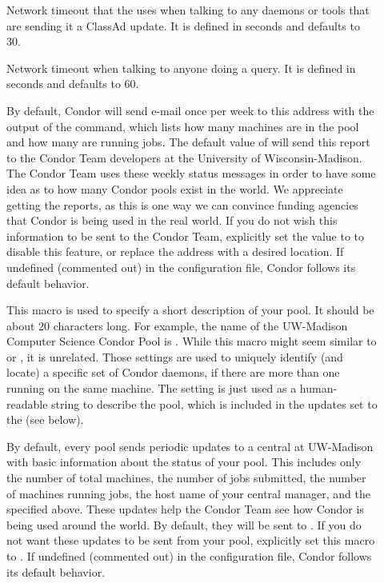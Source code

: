 \begin{description}
\item[] \label{param:ClientTimeout} Network
  timeout that the  uses when talking to any daemons
  or tools that are sending it a ClassAd update.
  It is defined in seconds and defaults to 30.
  
\item[] \label{param:QueryTimeout} Network
  timeout when talking to anyone doing a query. It is defined in seconds
  and defaults to 60.
  
\item[] \label{param:CondorDevelopers}
  By default,
  Condor will send e-mail once per week to this address with the output
  of the  command, which lists how many machines
  are in the pool and how many are running jobs.  The default
  value of  will send this report to
  the Condor Team developers at the University of Wisconsin-Madison.
  The Condor Team uses
  these weekly status messages in order to have some idea as to how
  many Condor pools exist in the world.  We appreciate
  getting the reports, as this is one way we can convince funding
  agencies that Condor is being used in the real world.  
  If you do not wish this information to be sent to the Condor Team,
  explicitly set the value to  to disable this feature,
  or replace the
  address with a desired location.  
  If undefined (commented out) in the configuration file, Condor follows
  its default behavior.

\item[] \label{param:CollectorName}
  This macro is used to specify a short description of your pool.
  It should be about 20 characters long.  For example, the name of the
  UW-Madison Computer Science Condor Pool is .  
  While this macro might seem similar to  or
  , it is unrelated.
  Those settings are used to uniquely identify (and locate) a specific
  set of Condor daemons, if there are more than one running on the same
  machine.
  The  setting is just used as a
  human-readable string to describe the pool, which is included in the
  updates set to the  (see
  below). 

\item[]
  \label{param:CondorDevelopersCollector} By default, every pool sends
  periodic updates to a central  at UW-Madison with
  basic information about the status of your pool.  This includes only
  the number of total machines, the number of jobs submitted, the
  number of machines running jobs, the host name of your central
  manager, and the  specified above.  These
  updates help the Condor Team see how Condor is being used around the world.
  By default, they will be sent to .
  If you do not want
  these updates to be sent from your pool,
  explicitly set this macro to . 
  If undefined (commented out) in the configuration file, Condor follows
  its default behavior.


\end{description}
